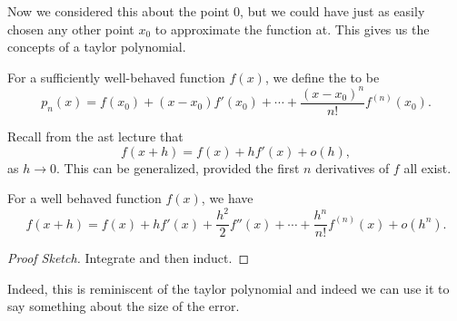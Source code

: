 \documentclass[a4]{scrartcl}
\begin{document}
Now we considered this about the point $0$, but we could have just as easily chosen any other point $x_0$ to approximate the function at. This gives us the concepts of a taylor polynomial.

\begin{definition}
For a sufficiently well-behaved function $f(x)$, we define the  to be
$$
p_n(x) = f(x_0) + (x - x_0) f'(x_0) + \cdots + \frac{(x - x_0)^n}{n!} f^{(n)}(x_0).
$$
\end{definition}

Recall from the ast lecture that
$$
f(x + h) = f(x) + hf'(x) + o(h), 
$$
as $h \rightarrow 0$. This can be generalized, provided the first $n$ derivatives of $f$ all exist.
\begin{theorem}
	For a well behaved function $f(x)$, we have
	$$
	f(x + h) = f(x) + h f'(x) + \frac{h^2}{2} f''(x) + \cdots + \frac{h^n}{n!} f^{(n)}(x) + o(h^n).
	$$
\end{theorem}
\begin{proof}[Proof Sketch]
	Integrate and then induct.
\end{proof}

Indeed, this is reminiscent of the taylor polynomial and indeed we can use it to say something about the size of the error. 







\end{document}
